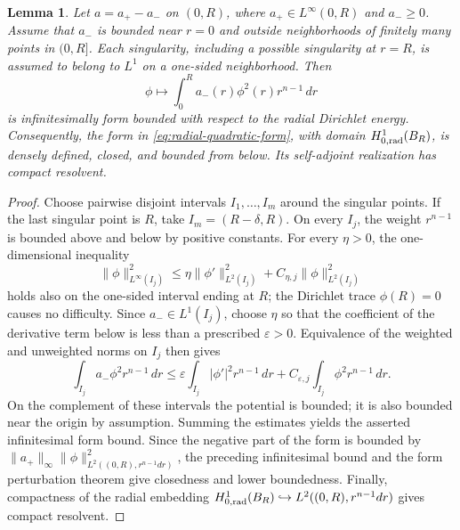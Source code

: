 \documentclass[11pt]{article}
\newtheorem{lemma}[theorem]{Lemma}
\begin{document}
\begin{lemma}\label{lem:singular-form}
Let $a=a_+-a_-$ on $(0,R)$, where $a_+\in L^\infty(0,R)$ and
$a_-\geq0$.  Assume that $a_-$ is bounded near $r=0$ and outside
neighborhoods of finitely many points in $(0,R]$.  Each singularity,
including a possible singularity at $r=R$, is assumed to belong to
$L^1$ on a one-sided neighborhood.  Then
\[
 \phi\longmapsto\int_0^R a_-(r)\phi^2(r)r^{n-1}\,dr
\]
is infinitesimally form bounded with respect to the radial Dirichlet
energy.  Consequently, the form in
\eqref{eq:radial-quadratic-form}, with domain
$H^1_{0,{\rm rad}}(B_R)$, is densely defined, closed, and bounded from
below.  Its self-adjoint realization has compact resolvent.
\end{lemma}

\begin{proof}
Choose pairwise disjoint intervals $I_1,\ldots,I_m$ around the
singular points.  If the last singular point is $R$, take
$I_m=(R-\delta,R)$.  On every $I_j$, the weight $r^{n-1}$ is bounded
above and below by positive constants.  For every $\eta>0$, the
one-dimensional inequality
\[
 \|\phi\|_{L^\infty(I_j)}^2
 \leq \eta\|\phi'\|_{L^2(I_j)}^2
 +C_{\eta,j}\|\phi\|_{L^2(I_j)}^2
\]
holds also on the one-sided interval ending at $R$; the Dirichlet trace
$\phi(R)=0$ causes no difficulty.  Since $a_-\in L^1(I_j)$, choose
$\eta$ so that the coefficient of the derivative term below is less
than a prescribed $\varepsilon>0$.  Equivalence of the weighted and
unweighted norms on $I_j$ then gives
\[
 \int_{I_j}a_-\phi^2r^{n-1}\,dr
 \leq \varepsilon\int_{I_j}|\phi'|^2r^{n-1}\,dr
 +C_{\varepsilon,j}\int_{I_j}\phi^2r^{n-1}\,dr.
\]
On the complement of these intervals the potential is bounded; it is
also bounded near the origin by assumption.  Summing the estimates
yields the asserted infinitesimal form bound.  Since the negative
part of the form is bounded by
 $\|a_+\|_\infty\|\phi\|_{L^2((0,R),r^{n-1}dr)}^2$, the preceding
 infinitesimal bound and the form perturbation theorem give closedness
 and lower boundedness.
Finally, compactness of the radial embedding
$H^1_{0,{\rm rad}}(B_R)\hookrightarrow L^2((0,R),r^{n-1}dr)$ gives
compact resolvent.
\end{proof}
\end{document}
